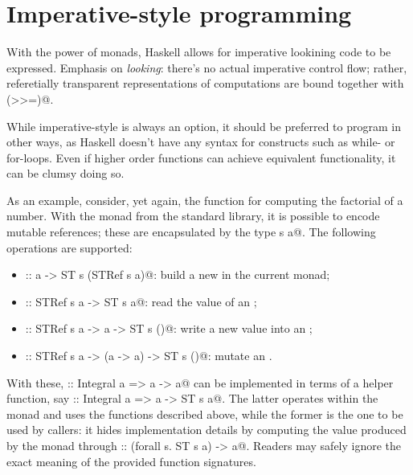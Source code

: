 \documentclass[UdineBachThesis,american,11pt,draft]{PhdThesis}
\begin{document}
  \section{Imperative-style programming}

  With the power of monads, Haskell allows for imperative lookining code to be
  expressed. Emphasis on \emph{looking}: there's no actual imperative control
  flow; rather, referetially transparent representations of computations are
  bound together with \lstinline@(>>=)@.

  While imperative-style is always an option, it should be preferred to program
  in other ways, as Haskell doesn't have any syntax for constructs such as
  while- or for-loops. Even if higher order functions can achieve equivalent
  functionality, it can be clumsy doing so.

  As an example, consider, yet again, the function for computing the factorial
  of a number. With the \lstinline@ST@ monad from the standard library, it is
  possible to encode mutable references; these are encapsulated by the type
  \lstinline@STRef s a@. The following operations are supported:

  \begin{itemize}
    \item \lstinline@newSTRef :: a -> ST s (STRef s a)@: build a new
    \lstinline@STRef@ in the current \lstinline@ST@ monad;

    \item \lstinline@readSTRef :: STRef s a -> ST s a@: read the value of an
    \lstinline@STRef@;

    \item \lstinline@writeSTRef :: STRef s a -> a -> ST s ()@: write a new value
    into an \lstinline@STRef@;

    \item \lstinline@modifySTRef :: STRef s a -> (a -> a) -> ST s ()@: mutate an
    \lstinline@STRef@.
  \end{itemize}

  With these, \lstinline@factorial :: Integral a => a -> a@ can be implemented
  in terms of a helper function, say
  \lstinline@factorialST :: Integral a => a -> ST s a@. The latter operates
  within the \lstinline@ST@ monad and uses the functions described above, while
  the former is the one to be used by callers: it hides implementation details
  by computing the value produced by the \lstinline@ST@ monad through
  \lstinline@runST :: (forall s. ST s a) -> a@. Readers may safely ignore the
  exact meaning of the provided function signatures.
\end{document}
